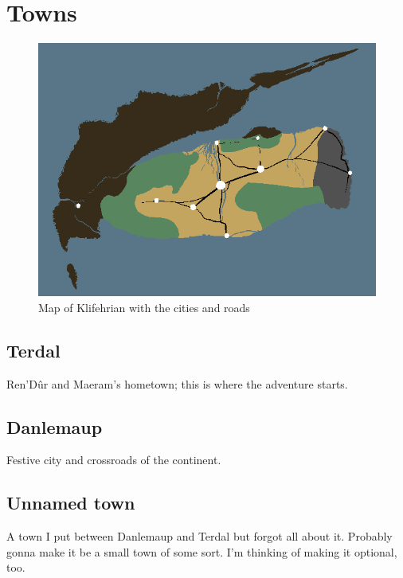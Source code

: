 \documentclass[a4paper,12pt]{book}
\begin{document}
\section{Towns}
\begin{figure}[h]
	\centering
		\includegraphics[scale=2]{worldmap_cities.png}
	\caption{Map of Klifehrian with the cities and roads}
	\label{fig:worldmap_cities}
\end{figure}
\subsection{Terdal}
Ren'D\^{u}r and Maeram's hometown; this is where the adventure starts.
\subsection{Danlemaup}
Festive city and crossroads of the continent.
\subsection{Unnamed town}
A town I put between Danlemaup and Terdal but forgot all about it. Probably gonna make it be a small town of some sort. I'm thinking of making it optional, too.
\end{document}

